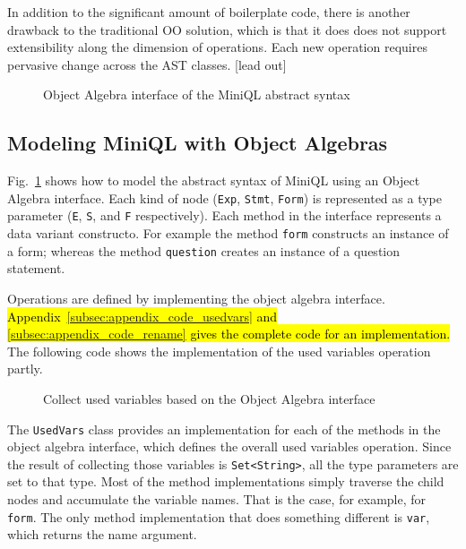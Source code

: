 In addition to the significant amount of boilerplate code, there is another  drawback to the traditional OO solution, which is that it does  does not support extensibility along the dimension of operations. Each new operation requires pervasive change across the AST classes.
[lead out]

\begin{figure}[t]
\nocaptionrule
\caption{Object Algebra interface of the MiniQL abstract syntax}
\label{ql_tree}
\end{figure}

\subsection{Modeling MiniQL with Object Algebras}\label{subsec:model_ql_with_oa}



Fig.~\ref{ql_tree} shows how  to model the abstract syntax of MiniQL
using an Object Algebra interface. Each kind of node (\lstinline{Exp}, \lstinline{Stmt}, \lstinline{Form})
is represented as a type parameter (\lstinline{E}, \lstinline{S}, and \lstinline{F} respectively).
Each method in the interface represents a data variant
constructo. For example the
method \lstinline{form} constructs an instance of a form; whereas the
method \lstinline{question} creates an instance of a question statement.

Operations are defined by implementing the object algebra interface. \hl{Appendix~\ref{subsec:appendix_code_usedvars} and \ref{subsec:appendix_code_rename} gives the complete code for an implementation.}
The following code shows the implementation of the used variables
operation partly.

\begin{figure}[t]
  \caption{Collect used variables based on the Object Algebra interface}
  \label{ql_usedvars}
\end{figure}

The \lstinline{UsedVars} class provides an implementation for each
of the methods in the object algebra interface, which defines the
overall used variables operation. Since the result of collecting those
variables is \lstinline{Set<String>}, all the type parameters are set to
that type. Most of the method implementations simply traverse the
child nodes and accumulate the variable names. That is the case, for
example, for \lstinline{form}. The only method implementation that does
something different is \lstinline{var}, which returns the name
argument.

